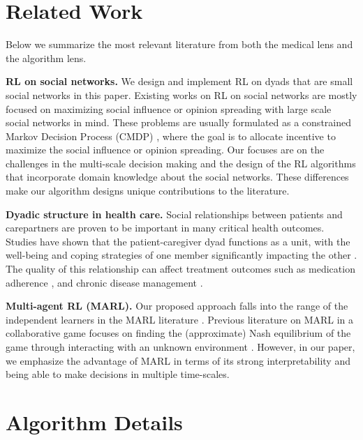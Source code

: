 

\section{Related Work}

Below we summarize the most relevant literature from both the medical lens and the algorithm lens.

\textbf{RL on social networks.} We design and implement RL on dyads that are small social networks in this paper. Existing works on RL on social networks are mostly focused on maximizing social influence or opinion spreading \cite{wang2021reinforcement,he2021reinforcement,yang2024balanced} with large scale social networks in mind. These problems are usually formulated as a constrained Markov Decision Process (CMDP) \cite{yang2024balanced}, where the goal is to allocate incentive to maximize the social influence or opinion spreading. Our focuses are on the challenges in the multi-scale decision making and the design of the RL algorithms that incorporate domain knowledge about the social networks. These differences make our algorithm designs unique contributions to the literature.

\textbf{Dyadic structure in health care.} Social relationships between patients and carepartners are proven to be important in many critical health outcomes. Studies have shown that the patient-caregiver dyad functions as a unit, with the well-being and coping strategies of one member significantly impacting the other \cite{shin2018supporting,mcpherson2024dyadic}. The quality of this relationship can affect treatment outcomes such as medication adherence \cite{psihogios2021understanding,kostalova2022medication,gresch2017medication}, and chronic disease management \cite{visintini2023medication,li2024usability}.

\textbf{Multi-agent RL (MARL).} Our proposed approach falls into the range of the independent learners in the MARL literature \cite{oroojlooy2023review}. Previous literature on MARL in a collaborative game focuses on finding the (approximate) Nash equilibrium of the game through interacting with an unknown environment \cite{wang2022cooperative,jin2021v}. However, in our paper, we emphasize the advantage of MARL in terms of its strong interpretability and being able to make decisions in multiple time-scales.

\section{Algorithm Details}
\label{app:algo}

